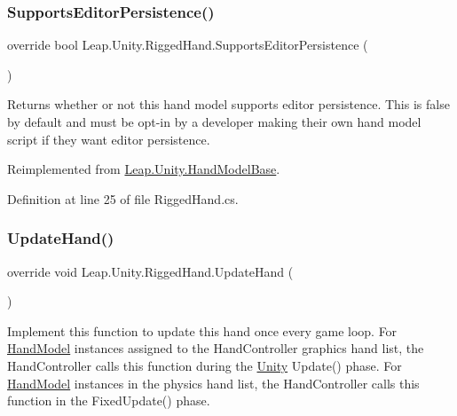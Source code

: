\subsubsection{\texorpdfstring{SupportsEditorPersistence()}{SupportsEditorPersistence()}}
{\footnotesize\ttfamily override bool Leap.\+Unity.\+Rigged\+Hand.\+Supports\+Editor\+Persistence (\begin{DoxyParamCaption}{ }\end{DoxyParamCaption})\hspace{0.3cm}{\ttfamily [virtual]}}



Returns whether or not this hand model supports editor persistence. This is false by default and must be opt-\/in by a developer making their own hand model script if they want editor persistence. 



Reimplemented from \mbox{\hyperlink{class_leap_1_1_unity_1_1_hand_model_base_acd4789523584dd7d240e1d426b4d321c}{Leap.\+Unity.\+Hand\+Model\+Base}}.



Definition at line 25 of file Rigged\+Hand.\+cs.

\mbox{\label{class_leap_1_1_unity_1_1_rigged_hand_ac4e41fd3965e2d0d56379d3fc6011128}} 
\subsubsection{\texorpdfstring{UpdateHand()}{UpdateHand()}}
{\footnotesize\ttfamily override void Leap.\+Unity.\+Rigged\+Hand.\+Update\+Hand (\begin{DoxyParamCaption}{ }\end{DoxyParamCaption})\hspace{0.3cm}{\ttfamily [virtual]}}

Implement this function to update this hand once every game loop. For \mbox{\hyperlink{class_leap_1_1_unity_1_1_hand_model}{Hand\+Model}} instances assigned to the Hand\+Controller graphics hand list, the Hand\+Controller calls this function during the \mbox{\hyperlink{namespace_leap_1_1_unity}{Unity}} Update() phase. For \mbox{\hyperlink{class_leap_1_1_unity_1_1_hand_model}{Hand\+Model}} instances in the physics hand list, the Hand\+Controller calls this function in the Fixed\+Update() phase. 


